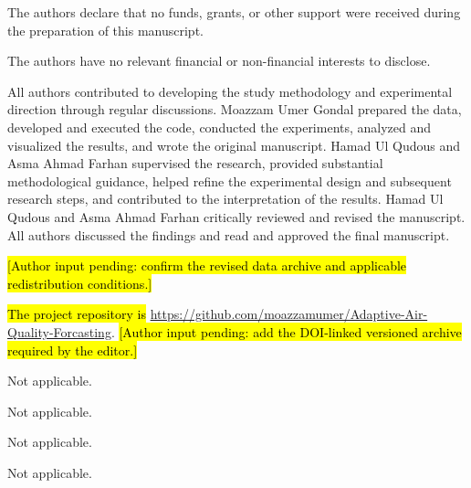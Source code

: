 \documentclass[pdflatex,sn-basic,Numbered]{sn-jnl}
\newcommand{\rev}[1]{\hl{#1}}
\begin{document}

The authors declare that no funds, grants, or other support were received during the preparation of this manuscript.


The authors have no relevant financial or non-financial interests to disclose.


All authors contributed to developing the study methodology and experimental direction through regular discussions. Moazzam Umer Gondal prepared the data, developed and executed the code, conducted the experiments, analyzed and visualized the results, and wrote the original manuscript. Hamad Ul Qudous and Asma Ahmad Farhan supervised the research, provided substantial methodological guidance, helped refine the experimental design and subsequent research steps, and contributed to the interpretation of the results. Hamad Ul Qudous and Asma Ahmad Farhan critically reviewed and revised the manuscript. All authors discussed the findings and read and approved the final manuscript.


\rev{[Author input pending: confirm the revised data archive and applicable redistribution conditions.]}


\rev{The project repository is} \url{https://github.com/moazzamumer/Adaptive-Air-Quality-Forcasting}. \rev{[Author input pending: add the DOI-linked versioned archive required by the editor.]}


Not applicable.


Not applicable.


Not applicable.


Not applicable.
\end{document}
